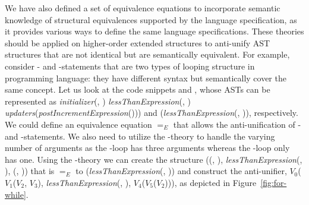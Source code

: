 We have also defined a set of equivalence equations to incorporate semantic knowledge of structural equivalences supported by the  language specification, as it provides various ways to define the same language specifications. These theories should be applied on higher-order extended structures to anti-unify AST structures that are not identical but are semantically equivalent. For example, consider - and -statements that are two types of looping structure in  programming language: they have different syntax but semantically cover the same concept. Let us look at the code snippets  and , whose ASTs can be represented as \textit{initializer}(, )\code{;} \textit{lessThanExpression}(, )\code{;} \textit{updaters}(\textit{postIncrementExpression}())) and (\textit{lessThanExpression}(, )), respectively. We could define an equivalence equation $=_E$ that allows the anti-unification of - and -statements. We also need to utilize the \NIL{}-theory to handle the varying number of arguments as the -loop has three arguments whereas the -loop only has one. Using the \NIL{}-theory we can create the structure (\NIL{}(\NIL{}, \NIL{}), \textit{lessThanExpression}(, ), \NIL{}(\NIL{}, \NIL{})) that is $=_E$ to (\textit{lessThanExpression}(, )) and construct the anti-unifier, $V_0$($V_1$($V_2$, $V_3$), \textit{lessThanExpression}(, ), $V_4$($V_5$($V_2$))), as depicted in Figure~\ref{fig:for-while}.

